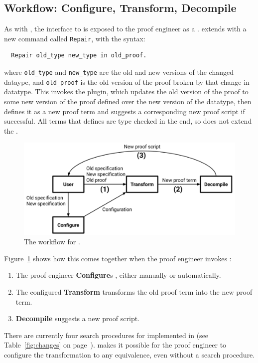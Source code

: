 \subsection{Workflow: Configure, Transform, Decompile}
\label{sec:pi-workflow}

As with \sysname, the interface to \toolnamec is exposed to the proof engineer as a .
\toolnamec extends \sysnamelong with a new command called \lstinline{Repair},
with the syntax:

\begin{lstlisting}
  Repair old_type new_type in old_proof.
\end{lstlisting}
where \lstinline{old_type} and \lstinline{new_type} are the old and new 
versions of the changed dataype, and \lstinline{old_proof} is the old version
of the proof broken by that change in datatype.
This invokes the \toolnamec plugin, which updates the old version of the proof to some new version of the proof
defined over the new version of the datatype, then defines it as a new proof term and suggests a corresponding new proof script if successful.
All terms that \toolnamec defines are type checked in the end, so \toolnamec does not extend the .

\begin{figure}
\includegraphics[width=\columnwidth]{often/workflowa.pdf}
\vspace{-0.7cm}
\caption{The workflow for \toolnamec.}
\vspace{-0.1cm}
\label{fig:system}
\end{figure}

Figure~\ref{fig:system} shows how this comes together when the proof engineer invokes \toolnamec:

\begin{enumerate}
\item The proof engineer \textbf{Configure}s \toolnamec, either manually or automatically.
\item The configured \textbf{Transform} transforms the old proof term into the new proof term.
\item \textbf{Decompile} suggests a new proof script. %
\end{enumerate}
There are currently four search procedures for  implemented in \toolnamec (see Table~\ref{fig:changes} on page~\pageref{fig:changes}).
 makes it possible
for the proof engineer to configure the transformation to any equivalence,
even without a search procedure.


